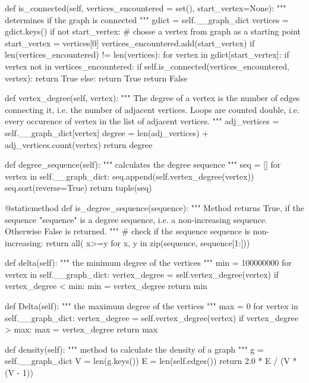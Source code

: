     def is_connected(self, 
                     vertices_encountered = set(), 
                     start_vertex=None):
        """ determines if the graph is connected """
        gdict = self.__graph_dict        
        vertices = gdict.keys() 
        if not start_vertex:
            # chosse a vertex from graph as a starting point
            start_vertex = vertices[0]
        vertices_encountered.add(start_vertex)
        if len(vertices_encountered) != len(vertices):
            for vertex in gdict[start_vertex]:
                if vertex not in vertices_encountered:
                    if self.is_connected(vertices_encountered, vertex):
                        return True
        else:
            return True
        return False

    def vertex_degree(self, vertex):
        """ The degree of a vertex is the number of edges connecting
            it, i.e. the number of adjacent vertices. Loops are counted 
            double, i.e. every occurence of vertex in the list 
            of adjacent vertices. """ 
        adj_vertices =  self.__graph_dict[vertex]
        degree = len(adj_vertices) + adj_vertices.count(vertex)
        return degree

    def degree_sequence(self):
        """ calculates the degree sequence """
        seq = []
        for vertex in self.__graph_dict:
            seq.append(self.vertex_degree(vertex))
        seq.sort(reverse=True)
        return tuple(seq)

    @staticmethod
    def is_degree_sequence(sequence):
        """ Method returns True, if the sequence "sequence" is a 
            degree sequence, i.e. a non-increasing sequence. 
            Otherwise False is returned.
        """
        # check if the sequence sequence is non-increasing:
        return all( x>=y for x, y in zip(sequence, sequence[1:]))
  

    def delta(self):
        """ the minimum degree of the vertices """
        min = 100000000
        for vertex in self.__graph_dict:
            vertex_degree = self.vertex_degree(vertex)
            if vertex_degree < min:
                min = vertex_degree
        return min
        
    def Delta(self):
        """ the maximum degree of the vertices """
        max = 0
        for vertex in self.__graph_dict:
            vertex_degree = self.vertex_degree(vertex)
            if vertex_degree > max:
                max = vertex_degree
        return max

    def density(self):
        """ method to calculate the density of a graph """
        g = self.__graph_dict
        V = len(g.keys())
        E = len(self.edges())
        return 2.0 * E / (V *(V - 1))

